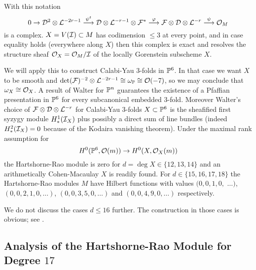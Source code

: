 \begin{theorem}\label{Pfaffian complex}
With this notation
$$0 \to {\mathcal D}^2\otimes{\mathcal L}^{-2r-1}
\stackrel{\psi^t}{\longrightarrow} {\mathcal D}\otimes{\mathcal L}^{-r-1}\otimes{\mathcal F}^* 
\stackrel{\varphi}{\longrightarrow} {\mathcal F}\otimes{\mathcal D}\otimes{\mathcal L}^{-r} 
\stackrel{\psi}{\longrightarrow} {\mathcal O}_M$$
is a complex. 
$X=V({\mathcal I}) \subset M$ has codimension $\le 3$ at every point, and in case equality
holds (everywhere along $X$) then 
this complex is exact and resolves the structure sheaf ${\mathcal O}_X={\mathcal O}_M/{\mathcal I}$ 
of the  locally Gorenstein subscheme $X$. 
\end{theorem}

We will apply this to construct Calabi-Yau 3-folds in ${\mathbb P}^6$. 
In that case we want $X$ to be smooth and 
$\operatorname{det}({\mathcal F})^{-2}\otimes{\mathcal L}^{-2r-1} \cong \omega_{\mathbb P}\cong {\mathcal O}(-7)$,
so we may conclude that $\omega_X \cong {\mathcal O}_X$. 
A result of Walter \cite{CO:Wa} for ${\mathbb P}^n$ guarantees the existence 
of a Pfaffian presentation in ${\mathbb P}^6$ for every subcanonical embedded 3-fold. 
Moreover Walter's choice of ${\mathcal F}\otimes{\mathcal D}\otimes{\mathcal L}^{-r}$ for Calabi-Yau 3-folds $X \subset {\mathbb P}^6$
is the sheafified first syzygy module $H^1_*({\mathcal I}_X)$ plus possibly 
a direct sum of line bundles 
(indeed $H^2_*({\mathcal I}_X)=0$ because of the Kodaira vanishing theorem). 
Under the maximal rank assumption for
$$H^0({\mathbb P}^6,{\mathcal O}(m)) \to H^0(X,{\mathcal O}_X(m))$$
the Hartshorne-Rao module is zero for $d=\deg X \in \{12,13,14\}$ and 
an arithmetically Cohen-Macaulay $X$ is readily found. 
For $d \in \{15,16,17,18\}$
the Hartshorne-Rao modules $M$ have Hilbert functions with values
$(0,0,1,0,$ $\ldots)$, $(0,0,2,1,0,\ldots)$, $(0,0,3,5,0,\ldots)$ and 
$(0,0,4,9,0,\ldots)$ respectively.

We do not discuss the cases $d\le 16$ further. 
The construction in those cases is obvious; see \cite{CO:To}.


\subsection{Analysis of the Hartshorne-Rao Module for Degree $17$}

